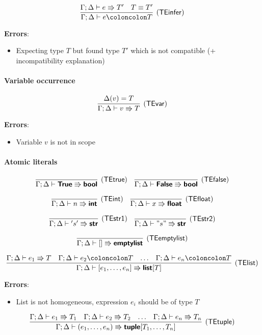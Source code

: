 \documentclass[a4paper]{article}
\newcommand{\kw}[1]{\textsf{\textbf{#1}}}
\newcommand{\mcode}[1]{\mathsf{#1}}
\newcommand{\colcol}{\coloncolon}
\newcommand{\yield}{\Rrightarrow}
\newcommand{\fun}[1]{\mathsf{#1}}
\begin{document}
$$
\infer[(\fun{TEinfer})]{\Gamma;\Delta \vdash e \colcol T}
{\Gamma;\Delta \vdash e \yield T' & T \equiv T'}
$$

\textbf{Errors}:
\begin{itemize}
\item Expecting type $T$ but found type $T'$ which is not compatible (+ incompatibility explanation)
\end{itemize}

\paragraph{Variable occurrence}

$$
\infer[(\fun{TEvar})]{\Gamma;\Delta \vdash v \yield T}{\Delta(v)=T}
$$

\textbf{Errors}:
\begin{itemize}
\item Variable $v$ is not in scope
\end{itemize}

\paragraph{Atomic literals}

$$
\infer[(\fun{TEtrue})]{\Gamma;\Delta \vdash \kw{True} \yield \kw{bool}}{}
\quad \infer[(\fun{TEfalse})]{\Gamma;\Delta \vdash \kw{False} \yield \kw{bool}}{}
$$

$$
\infer[(\fun{TEint})]{\Gamma;\Delta \vdash n \yield \kw{int}}{}
\quad \infer[(\fun{TEfloat})]{\Gamma;\Delta \vdash x \yield \kw{float}}{}
$$

$$
\infer[(\fun{TEstr1})]{\Gamma;\Delta \vdash \mcode{'}s\mcode{'} \yield \kw{str}}{}
\quad \infer[(\fun{TEstr2})]{\Gamma;\Delta \vdash \mcode{"}s\mcode{"} \yield \kw{str}}{}
$$

$$
\infer[(\fun{TEemptylist})]{\Gamma;\Delta \vdash \mcode{[]} \yield \kw{emptylist}}
  {}
$$

$$
\infer[(\fun{TElist})]{\Gamma;\Delta \vdash \mcode{[}e_1,\ldots,e_n\mcode{]} \yield \kw{list}[T]}
  {\Gamma;\Delta \vdash e_1 \yield T & \Gamma;\Delta \vdash e_2 \colcol T & \ldots &  \Gamma;\Delta \vdash e_n \colcol T}
$$

\textbf{Errors}:
\begin{itemize}
\item List is not homogeneous, expression $e_i$ should be of type $T$
\end{itemize}

$$
\infer[(\fun{TEtuple})]{\Gamma;\Delta \vdash \mcode{(}e_1,\ldots,e_n\mcode{)} \yield \kw{tuple}[T_1,\ldots,T_n]}
  {\Gamma;\Delta \vdash e_1 \yield T_1 & \Gamma;\Delta \vdash e_2 \yield T_2 & \ldots &  \Gamma;\Delta \vdash e_n \yield T_n}
$$
\end{document}
